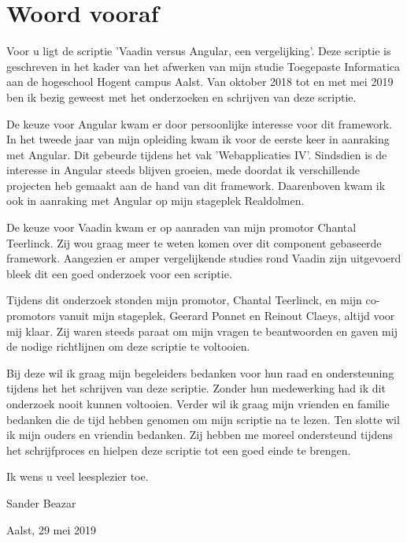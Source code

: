 
\chapter*{Woord vooraf}
\label{ch:voorwoord}
Voor u ligt de scriptie 'Vaadin versus Angular, een vergelijking'. Deze scriptie is geschreven in het kader van het afwerken van mijn studie Toegepaste Informatica aan de hogeschool Hogent campus Aalst. Van oktober 2018 tot en met mei 2019 ben ik bezig geweest met het onderzoeken en schrijven van deze scriptie. 

De keuze voor Angular kwam er door persoonlijke interesse voor dit framework. In het tweede jaar van mijn opleiding kwam ik voor de eerste keer in aanraking met Angular. Dit gebeurde tijdens het vak 'Webapplicaties IV'. Sindsdien is de interesse in Angular steeds blijven groeien, mede doordat ik verschillende projecten heb gemaakt aan de hand van dit framework. Daarenboven kwam ik ook in aanraking met Angular op mijn stageplek Realdolmen. 

De keuze voor Vaadin kwam er op aanraden van mijn promotor Chantal Teerlinck. Zij wou graag meer te weten komen over dit component gebaseerde framework. Aangezien er amper vergelijkende studies rond Vaadin zijn uitgevoerd bleek dit een goed onderzoek voor een scriptie.

Tijdens dit onderzoek stonden mijn promotor, Chantal Teerlinck, en mijn co-promotors vanuit mijn stageplek, Geerard Ponnet en Reinout Claeys, altijd voor mij klaar. Zij waren steeds paraat om mijn vragen te beantwoorden en gaven mij de nodige richtlijnen om deze scriptie te voltooien.

Bij deze wil ik graag mijn begeleiders bedanken voor hun raad en ondersteuning tijdens het het schrijven van deze scriptie. Zonder hun medewerking had ik dit onderzoek nooit kunnen voltooien.
Verder wil ik graag mijn vrienden en familie bedanken die de tijd hebben genomen om mijn scriptie na te lezen. 
Ten slotte wil ik mijn ouders en vriendin bedanken. Zij hebben me moreel ondersteund tijdens het schrijfproces en hielpen deze scriptie tot een goed einde te brengen.

Ik wens u veel leesplezier toe.

Sander Beazar

Aalst, 29 mei 2019





